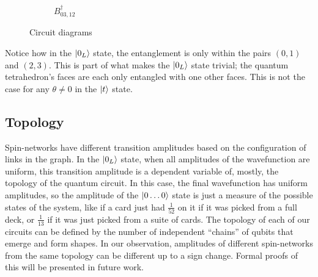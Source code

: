 \documentclass[a4paper,11pt,aps,tightenlines,nofootinbib]{revtex4}
\begin{document}
\begin{figure}[h!]
\begin{subfigure}[b]{.3\textwidth}
                \caption{$B^\dagger_{03,12}$}
                \end{subfigure}
                \caption{Circuit diagrams \cite{cirq}}
        \end{figure}

        Notice how in the $\ket{0_L}$ state, the entanglement is only within the pairs $(0,1)$ and $(2,3)$. This is part of what makes the $\ket{0_L}$ state trivial;
        the quantum tetrahedron's faces are each only entangled with one other faces. This is not the case for any $\theta\neq 0$ in the $\ket{t}$ state.

\subsection{Topology}
        Spin-networks have different transition amplitudes based on the configuration of links in the graph. In the $\ket{0_L}$ state, when all amplitudes of the wavefunction 
        are uniform, this transition amplitude is a dependent variable of, mostly, the topology of the quantum circuit. In this case, the final wavefunction  %
        has uniform amplitudes, so the amplitude of the $\ket{0\dots0}$ state is just a measure of the possible states of the system, like if a card just had $\frac{1}{52}$ on it if it was 
        picked from a full deck, or $\frac{1}{13}$ if it was just picked from a suite of cards. The topology of each of our circuits can be defined by the number of independent ``chains'' 
        of qubits that emerge and form shapes. In our observation, amplitudes of different spin-networks from the same topology can be different up to a sign change. Formal proofs of this 
        will be presented in future work.
\end{document}
